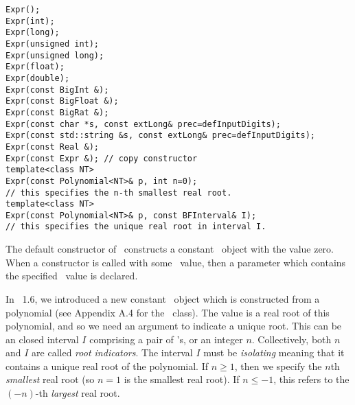 \begin{progb}{
\> \tt  Expr(); \\
\> \tt  Expr(int); \\
\> \tt  Expr(long); \\
\> \tt  Expr(unsigned int); \\
\> \tt  Expr(unsigned long); \\
\> \tt  Expr(float); \\
\> \tt  Expr(double); \\
\> \tt  Expr(const BigInt \&); \\
\> \tt  Expr(const BigFloat \&); \\
\> \tt  Expr(const BigRat \&); \\
\> \tt  Expr(const char *s, const extLong\& prec=defInputDigits); \\
\> \tt  Expr(const std::string \&s, const extLong\& prec=defInputDigits); \\
\> \tt  Expr(const Real \&); \\
\> \tt  Expr(const Expr \&); // copy constructor \\
\> \tt  template<class NT> \\
\>\> \tt  Expr(const Polynomial<NT>\& p, int n=0);\\
\>\>\>	// this specifies the n-th smallest real root. \\
\> \tt  template<class NT> \\
\>\> \tt  Expr(const Polynomial<NT>\& p, const BFInterval\& I);\\
\>\>\>	// this specifies the unique real root in interval I.
}\end{progb}

The default constructor of \expr\ constructs a constant
\expr\ object with the value zero.
When a constructor is called with some \real\ value, then a 
parameter which contains the specified \real\ value is declared.

In \corelib\ 1.6, we introduced a new constant \expr\ object which is
constructed from a polynomial (see Appendix A.4 for 
the \Poly\ class).  The value is a real root of
this polynomial, and so we need an argument to indicate
a unique root.  This can be an closed interval $I$
comprising a pair of \BF's, or an integer $n$.  
Collectively, both $n$ and $I$ are called {\em root indicators}.
The interval $I$ must be {\em isolating} meaning
that it contains a unique real root of the polynomial.
If $n\ge 1$, then we specify the $n$th
{\em smallest} real root (so $n=1$ is the smallest real root).
If $n\le -1$, this refers to the $(-n)$-th {\em largest} real root.

